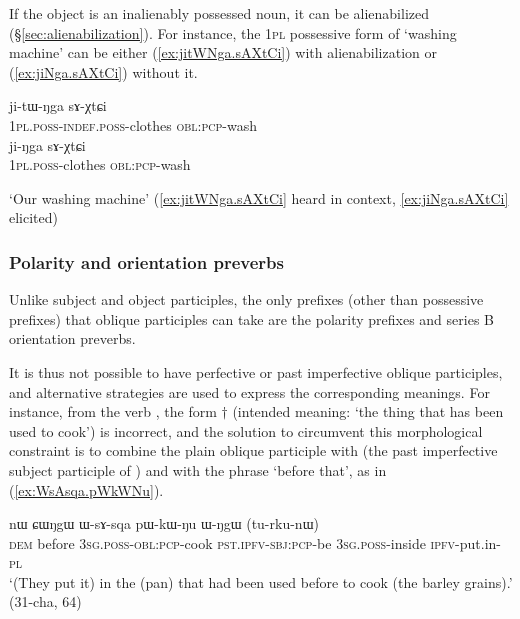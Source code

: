 If the object is an inalienably possessed noun, it can be alienabilized (§\ref{sec:alienabilization}). For instance, the \textsc{1pl} possessive form of  `washing machine' can be either (\ref{ex:jitWNga.sAXtCi}) with alienabilization or (\ref{ex:jiNga.sAXtCi}) without it.

\begin{exe}
\ex
\begin{xlist}
\ex \label{ex:jitWNga.sAXtCi}
\gll ji-tɯ-ŋga sɤ-χtɕi \\
\textsc{1pl}.\textsc{poss}-\textsc{indef}.\textsc{poss}-clothes \textsc{obl}:\textsc{pcp}-wash \\
\ex \label{ex:jiNga.sAXtCi}
\gll ji-ŋga sɤ-χtɕi \\
\textsc{1pl}.\textsc{poss}-clothes \textsc{obl}:\textsc{pcp}-wash \\
\end{xlist}
\glt `Our washing machine' (\ref{ex:jitWNga.sAXtCi} heard in context, \ref{ex:jiNga.sAXtCi} elicited)
\end{exe}

\subsubsection{Polarity and orientation preverbs} \label{sec:oblique.participle.orientation}
Unlike subject and object participles, the only prefixes (other than possessive prefixes) that oblique participles can take are the polarity prefixes and series B orientation preverbs.

It is thus not possible to have perfective or past imperfective oblique participles, and alternative strategies are used to express the corresponding meanings. For instance, from the verb , the form $\dagger$ (intended meaning: `the thing that has been used to cook') is incorrect, and the solution to circumvent this morphological constraint is to combine the plain oblique participle  with  (the past imperfective subject participle of ) and with the phrase  `before that', as in (\ref{ex:WsAsqa.pWkWNu}).

\begin{exe}
\ex \label{ex:WsAsqa.pWkWNu}
\gll  nɯ ɕɯŋgɯ ɯ-sɤ-sqa pɯ-kɯ-ŋu ɯ-ŋgɯ (tu-rku-nɯ) \\
\textsc{dem} before \textsc{3sg}.\textsc{poss}-\textsc{obl}:\textsc{pcp}-cook \textsc{pst}.\textsc{ipfv}-\textsc{sbj}:\textsc{pcp}-be \textsc{3sg}.\textsc{poss}-inside \textsc{ipfv}-put.in-\textsc{pl} \\
\glt `(They put it) in the (pan) that had been used before to cook (the barley grains).' (31-cha, 64)
\end{exe}

